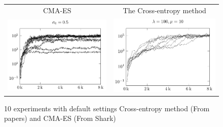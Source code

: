 \begin{figure}[H]
\begin{tabular}{@{}c@{}c@{}}
CMA-ES & The Cross-entropy method\\
\includegraphics[scale=1]{plots/cma_initial_sigma_0_5} &
\includegraphics[scale=1]{plots/ce_ConstantNoise_l100_o10_all}
\end{tabular}
\caption{10 experiments with default settings Cross-entropy method (From papers) and CMA-ES (From Shark) \label{fig:appendix:initialNonmean}}
\end{figure}


